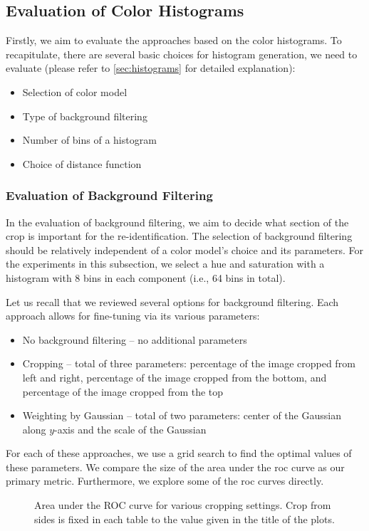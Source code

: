 \subsection{Evaluation of Color Histograms}

Firstly, we aim to evaluate the approaches based on the color histograms. To recapitulate, there are several basic choices
for histogram generation, we need to evaluate (please refer to
\autoref{sec:histograms} for detailed explanation):

\begin{itemize}
    \item Selection of color model
    \item Type of background filtering
    \item Number of bins of a histogram
    \item Choice of distance function
\end{itemize}

\subsubsection{Evaluation of Background Filtering}

In the evaluation of background filtering, we
aim to decide what section of the crop is important for the re-identification. The selection of background filtering should be relatively independent of
a color model's choice and its parameters. For the experiments in this
subsection, we select a hue and saturation with a histogram with 8 bins in
each component (i.e., 64 bins in total).

Let us recall that we reviewed several options for background filtering.
Each approach allows for fine-tuning via its various parameters:

\begin{itemize}
    \item No background filtering -- no additional parameters
    \item Cropping -- total of three parameters: percentage of the image cropped from left and right, percentage of the image cropped from the bottom, and percentage of the image cropped from the top
    \item Weighting by Gaussian -- total of two parameters: center of the Gaussian along $y$-axis and the scale of the Gaussian
\end{itemize}

For each of these approaches, we use a grid search to find the optimal values of
these parameters. We compare the size of the
area under the \gls{roc} curve as our primary metric. Furthermore, we explore some of the
\gls{roc} curves directly.
\begin{figure}
    \centering
    \def\svgwidth{\columnwidth}
    \Large
    \scalebox{0.6}{}
    \scalebox{0.6}{}
    \scalebox{0.6}{}
    \caption{Area under the ROC curve for various cropping settings. Crop from sides is fixed in each table to the value given in the title of the plots.}
    \label{fig:aoc_crop}
\end{figure}

